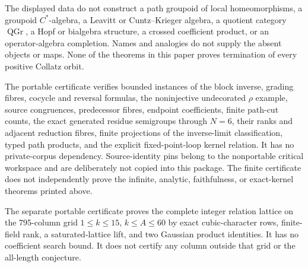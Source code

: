 \begin{nonclaim}
The displayed data do not construct a path groupoid of local homeomorphisms,
a groupoid $C^*$-algebra, a Leavitt or Cuntz--Krieger algebra, a quotient
category $\operatorname{QGr}$, a Hopf or bialgebra structure, a crossed
coefficient product, or an operator-algebra completion.  Names and analogies
do not supply the absent objects or maps.  None of the theorems in this paper
proves termination of every positive Collatz orbit.
\end{nonclaim}

The portable certificate
 verifies bounded instances of the
block inverse, grading fibres, cocycle and reversal formulas, the
noninjective undecorated $\rho$ example, source congruences, predecessor
fibres, endpoint coefficients, finite path-cut counts, the exact generated
residue semigroups through $N=6$, their ranks and adjacent reduction fibres,
finite projections of the inverse-limit classification, typed path products,
and the explicit fixed-point-loop kernel relation.  It has no private-corpus
dependency.  Source-identity pins belong to the nonportable critical
workspace and are deliberately not copied into this package.  The finite
certificate does not independently prove the infinite, analytic,
faithfulness, or exact-kernel theorems printed above.

The separate portable certificate
 proves the complete
integer relation lattice on the 795-column grid
$1\leq k\leq15$, $k\leq A\leq60$ by exact cubic-character rows, finite-field
rank, a saturated-lattice lift, and two Gaussian product identities.  It has
no coefficient search bound.  It does not certify any column outside that
grid or the all-length conjecture.
